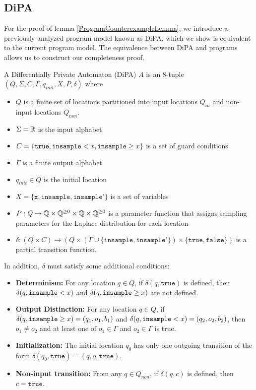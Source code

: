 \subsection{DiPA}

For the proof of lemma \ref{ProgramCounterexampleLemma}, we introduce a previously analyzed program model known as DiPA, which we show is equivalent to the current program model. The equivalence between DiPA and programs allows us to construct our completeness proof. 

\begin{defn}
    A Differentially Private Automaton (DiPA) $A$ is an 8-tuple $(Q, \Sigma, C, \Gamma, q_{init}, X, P, \delta)$ where
    \begin{itemize}
        \item $Q$ is a finite set of locations partitioned into input locations $Q_{in}$ and non-input locations $Q_{non}$. 
        \item $\Sigma = \mathbb{R}$ is the input alphabet
        \item $C = \{\texttt{true}, \texttt{insample} < x, \texttt{insample}\geq x\}$ is a set of guard conditions
        \item $\Gamma$ is a finite output alphabet
        \item $q_{init}\in Q$ is the initial location
        \item $X = \{\texttt{x}, \texttt{insample}, \texttt{insample}'\}$ is a set of variables
        \item $P: Q\to \mathbb{Q}\times \mathbb{Q}^{\geq 0}\times \mathbb{Q}\times  \mathbb{Q}^{\geq 0}$ is a parameter function that assigns sampling parameters for the Laplace distribution for each location
        \item $\delta:(Q\times C)\to (Q\times (\Gamma \cup \{\texttt{insample}, \texttt{insample}'\})\times \{\texttt{true}, \texttt{false}\})$ is a partial transition function. 
    \end{itemize}
    In addition, $\delta$ must satisfy some additional conditions:
    \begin{itemize}
        \item \textbf{Determinism:} For any location $q\in Q$, if $\delta(q,\texttt{true})$ is defined, then $\delta(q,\texttt{insample} < x)$ and $\delta(q,\texttt{insample}\geq x)$ are not defined. 

        \item \textbf{Output Distinction:} For any location $q\in Q$, if $\delta(q, \texttt{insample}\geq x) = (q_1, o_1, b_1)$ and $\delta(q, \texttt{insample} < x) = (q_2, o_2, b_2)$, then $o_1\neq o_2$ and at least one of $o_1\in \Gamma$ and $o_2\in \Gamma$ is true.

        \item \textbf{Initialization:} The initial location $q_0$ has only one outgoing transition of the form $\delta(q_0, \texttt{true}) = (q, o, \texttt{true})$.

        \item \textbf{Non-input transition:} From any $q\in Q_{non}$, if $\delta(q, c)$ is defined, then $c=\texttt{true}$.
    \end{itemize}
\end{defn}

